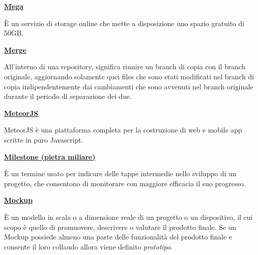 \bigskip
\begin{addmargin}[0em]{0em}	
	\textbf{\underline{Mega}} 
\end{addmargin}
	
\medskip
\begin{addmargin}[5em]{1em}
È un servizio di storage online che mette a disposizione uno spazio gratuito di 50GB. 
\end{addmargin}	

\bigskip
\begin{addmargin}[0em]{0em}	
	\textbf{\underline{Merge}} 
\end{addmargin}

\medskip
\begin{addmargin}[5em]{1em}	
All'interno di una repository, significa riunire un branch di copia con il branch originale, aggiornando solamente quei files che sono stati modificati nel branch di copia indipendentemente
dai cambiamenti che sono avvenuti nel branch originale durante il periodo di separazione dei due.
\end{addmargin}

\bigskip
\begin{addmargin}[0em]{0em}	
	\textbf{\underline{MeteorJS}} 
\end{addmargin}

\medskip
\begin{addmargin}[5em]{1em}	
MeteorJS è una piattaforma completa per la costruzione di web e mobile app scritte in puro Javascript.
\end{addmargin}

\newpage
\begin{addmargin}[0em]{0em}	
	\textbf{\underline{Milestone (pietra miliare)}} 
\end{addmargin}
	
\medskip
\begin{addmargin}[5em]{1em}	
È un termine usato per indicare delle tappe intermedie nello sviluppo di un progetto, che consentono di monitorare con maggiore efficacia il suo progresso.
\end{addmargin}	

\begin{addmargin}[0em]{0em}	
	\textbf{\underline{Mockup}} 
\end{addmargin}
	
\medskip
\begin{addmargin}[5em]{1em}	
È un modello in scala o a dimensione reale di un progetto o un dispositivo, il cui scopo è quello di promuovere, descrivere o valutare il prodotto finale. Se un Mockup possiede almeno una parte delle funzionalità del prodotto finale e consente il loro collaudo allora viene definito \textit{prototipo}.
\end{addmargin}	

